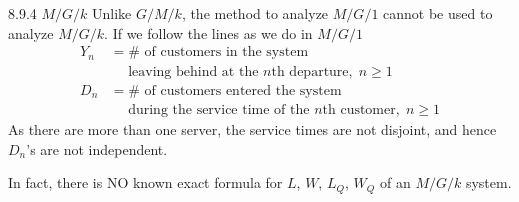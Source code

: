 \documentclass[letterpaper,handout]{beamer}
\begin{document}
\begin{frame}{8.9.4 $M/G/k$}
Unlike $G/M/k$, the method to analyze $M/G/1$ cannot be used to analyze $M/G/k$.
If we follow the lines as we do in $M/G/1$
\begin{align*}
Y_n &=\#\mbox{ of customers in the system}\\
&\quad\mbox{ leaving behind at the $n$th departure},\; n\ge 1\\
D_n &=\#\mbox{ of customers entered the system}\\
&\quad\mbox{ during the service time of the $n$th customer},\; n\ge 1
\end{align*}
As there are more than one server, the service times are not disjoint,
and hence $D_n$'s are not independent.\bigskip

In fact, there is NO known exact formula for $L$, $W$, $L_Q$, $W_Q$ of an $M/G/k$ system.
\end{frame}
\end{document}
